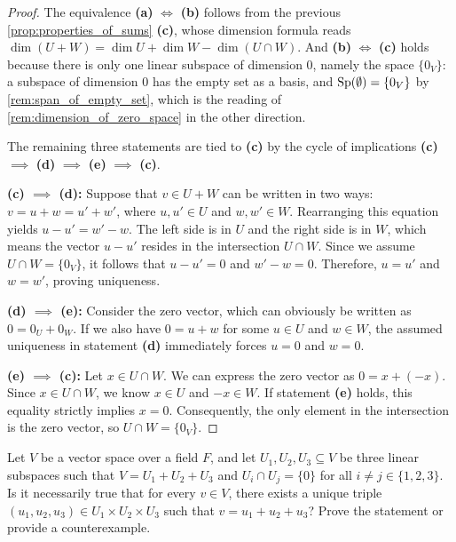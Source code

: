 \begin{proof}
The equivalence \textbf{(a)} $\iff$ \textbf{(b)} follows from the previous \cref{prop:properties_of_sums} \textbf{(c)}, whose dimension formula reads $\dim(U + W) = \dim U + \dim W - \dim(U \cap W)$. And \textbf{(b)} $\iff$ \textbf{(c)} holds because there is only one linear subspace of dimension $0$, namely the space $\{0_V\}$: a subspace of dimension $0$ has the empty set as a basis, and $\operatorname{Sp}(\emptyset) = \{0_V\}$ by \cref{rem:span_of_empty_set}, which is the reading of \cref{rem:dimension_of_zero_space} in the other direction.

The remaining three statements are tied to \textbf{(c)} by the cycle of implications \textbf{(c)} $\implies$ \textbf{(d)} $\implies$ \textbf{(e)} $\implies$ \textbf{(c)}.

\textbf{(c) $\implies$ (d):} Suppose that $v \in U + W$ can be written in two ways: $v = u + w = u' + w'$, where $u, u' \in U$ and $w, w' \in W$. Rearranging this equation yields $u - u' = w' - w$. The left side is in $U$ and the right side is in $W$, which means the vector $u - u'$ resides in the intersection $U \cap W$. Since we assume $U \cap W = \{0_V\}$, it follows that $u - u' = 0$ and $w' - w = 0$. Therefore, $u = u'$ and $w = w'$, proving uniqueness.

\textbf{(d) $\implies$ (e):} Consider the zero vector, which can obviously be written as $0 = 0_U + 0_W$. If we also have $0 = u + w$ for some $u \in U$ and $w \in W$, the assumed uniqueness in statement \textbf{(d)} immediately forces $u = 0$ and $w = 0$.

\textbf{(e) $\implies$ (c):} Let $x \in U \cap W$. We can express the zero vector as $0 = x + (-x)$. Since $x \in U \cap W$, we know $x \in U$ and $-x \in W$. If statement \textbf{(e)} holds, this equality strictly implies $x = 0$. Consequently, the only element in the intersection is the zero vector, so $U \cap W = \{0_V\}$.
\end{proof}

\begin{exercise}
\label{exc:pairwise_trivial_vs_direct_sum}
Let $V$ be a vector space over a field $F$, and let $U_1, U_2, U_3 \subseteq V$ be three linear subspaces such that $V = U_1 + U_2 + U_3$ and $U_i \cap U_j = \{0\}$ for all $i \ne j \in \{1, 2, 3\}$.
Is it necessarily true that for every $v \in V$, there exists a unique triple $(u_1, u_2, u_3) \in U_1 \times U_2 \times U_3$ such that $v = u_1 + u_2 + u_3$? Prove the statement or provide a counterexample.
\end{exercise}

